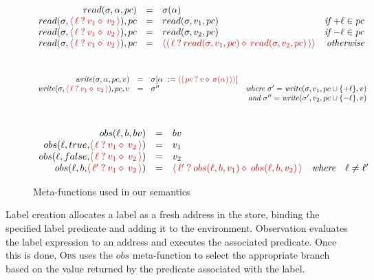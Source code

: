 \documentclass[review=true,acmlarge]{acmart}
\newcommand{\colorFAC}{black!20!red}
\newcommand{\fcol}[1] {{\color{\colorFAC} #1}}
\newcommand{\rmth}[1] {{\color{\colorFAC} $#1$}}
\newcommand{\facet}[3]{{\fcol{\ensuremath{\langle \, {#1} \: ? \: {#2} \diamond \: {#3} \, \rangle}}}}
\newcommand{\formfacet}[3]{{\fcol{\ensuremath{\langle \langle \, {#1} \: ? \: {#2} \diamond \: {#3} \,  \rangle \rangle}}}}
\newcommand{\var}[1]{\mathit{#1}}
\begin{document}
\begin{figure*}
      \begin{displaymath}
        \begin{array}{rclrr}
          {read(\sigma, \alpha, pc)} & {=} & {\sigma(\alpha)} & & \\
          {read(\sigma, \facet{\ell}{v_1}{v_2}), pc} & = & {read(\sigma, v_1, pc)} & \textit{if} ~ {+\ell} \in pc & \\
          {read(\sigma, \facet{\ell}{v_1}{v_2}), pc} & = & {read(\sigma, v_2, pc)} & \textit{if} ~ {-\ell} \in pc & \\
          {read(\sigma, \facet{\ell}{v_1}{v_2}), pc} & = & {\formfacet{\ell}{read(\sigma, v_1, pc)}{read(\sigma, v_2, pc)}} & \textit{otherwise} &
        \end{array}
      \end{displaymath}
      \\
      \begin{displaymath}
        \begin{array}{rclrr}
          {\var{write}(\sigma, \alpha, pc, v)} & {=} & {\sigma[\alpha ~ := \formfacet{pc}{v}{\sigma(\alpha)}]} & & \\
          {\var{write}(\sigma, \facet{\ell}{v_1}{v_2}), pc, v} & = & {\sigma''} & \textit{where} ~ {\sigma' = \var{write}(\sigma, v_1, pc \cup \{+\ell\}, v)} \\
          & & & \textit{and} ~ {\sigma'' = \var{write}(\sigma', v_2, pc \cup \{-\ell\}, v)}
        \end{array}
      \end{displaymath}
      \\
      \begin{displaymath}
        \begin{array}{rclrr}
          {obs(\ell, b, bv)} & {=} & {bv} & & \\
          {obs(\ell, true,} \facet{\ell}{v_1}{v_2}) & = & {v_1} & & \\
          {obs(\ell, false,} \facet{\ell}{v_1}{v_2}) & = & {v_2} & & \\
          {obs(\ell, b,} \facet{\ell'}{v_1}{v_2}) & = & \facet{\ell'}{obs(\ell,b,v_1)}{obs(\ell,b,v_2)} & \textit{where} & {\ell} \neq {\ell'}
        \end{array}
      \end{displaymath}
      \caption{Meta-functions used in our semantics}
      \label{fig:metafunctions}
\end{figure*}

Label creation allocates a label as a fresh address in the store,
binding the specified label predicate and adding it to the
environment. Observation evaluates the label expression to an address
and executes the associated predicate. Once this is done, \textsc{Obs}
uses the \rmth{\var{obs}} meta-function to select the appropriate branch
based on the value returned by the predicate associated with the
label.
\end{document}
